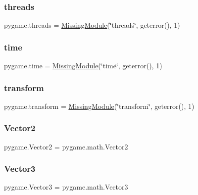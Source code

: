 \mbox{\label{namespacepygame_a966adc46b8b79feca6e11c88e40f7059}} 
\subsubsection{\texorpdfstring{threads}{threads}}
{\footnotesize\ttfamily pygame.\+threads = \hyperlink{classpygame_1_1_missing_module}{Missing\+Module}(\char`\"{}threads\char`\"{}, geterror(), 1)}

\mbox{\label{namespacepygame_a8bfece8a6e15e03662299926a400b0af}} 
\subsubsection{\texorpdfstring{time}{time}}
{\footnotesize\ttfamily pygame.\+time = \hyperlink{classpygame_1_1_missing_module}{Missing\+Module}(\char`\"{}time\char`\"{}, geterror(), 1)}

\mbox{\label{namespacepygame_a5f9cc11ad1c22771ac675e697d613a95}} 
\subsubsection{\texorpdfstring{transform}{transform}}
{\footnotesize\ttfamily pygame.\+transform = \hyperlink{classpygame_1_1_missing_module}{Missing\+Module}(\char`\"{}transform\char`\"{}, geterror(), 1)}

\mbox{\label{namespacepygame_a0dc9802647a8da36ba7b3c067c4695e8}} 
\subsubsection{\texorpdfstring{Vector2}{Vector2}}
{\footnotesize\ttfamily pygame.\+Vector2 = pygame.\+math.\+Vector2}

\mbox{\label{namespacepygame_a0ddff43d641e42c5651cef77a9c57479}} 
\subsubsection{\texorpdfstring{Vector3}{Vector3}}
{\footnotesize\ttfamily pygame.\+Vector3 = pygame.\+math.\+Vector3}

